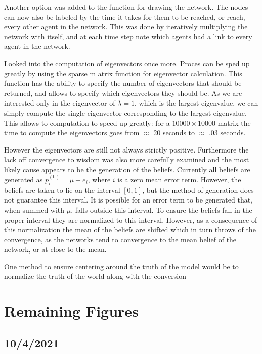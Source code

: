 \documentclass{article}
\begin{document}
Another option was added to the function for drawing the network. The nodes can now also be labeled by the time it takes for them to be reached, or reach, every other agent in the network. This was done by iteratively multiplying the network with itself, and at each time step note which agents had a link to every agent in the network. \newline

Looked into the computation of eigenvectors once more. Proces can be sped up greatly by using the sparse m atrix function for eigenvector calculation. This function has the ability to specify the number of eigenvectors that should be returned, and allows to specify which eigenvectors they should be. As we are interested only in the eigenvector of $\lambda=1$, which is the largest eigenvalue, we can simply compute the single eigenvector corresponding to the largest eigenvalue. This allows to computation to speed up greatly: for a $10000\times 10000$ matrix the time to compute the eigenvectors goes from $\approx$ 20 seconds to $\approx$ .03 seconds.

However the eigenvectors are still not always strictly positive. Furthermore the lack off convergence to wisdom was also more carefully examined and the most likely cause appears to be the generation of the beliefs. Currently all beliefs are generated as $p_i^{(0)} = \mu + e_i$, where $i$ is a zero mean error term. However, the beliefs are taken to lie on the interval $[0, 1]$, but the method of generation does not guarantee this interval. It is possible for an error term to be generated that, when summed with $\mu$, falls outside this interval. To ensure the beliefs fall in the proper interval they are normalized to this interval. However, as a consequence of this normalization the mean of the beliefs are shifted which in turn throws of the convergence, as the networks tend to convergence to the mean belief of the network, or at close to the mean. 

One method to ensure centering around the truth of the model would be to normalize the truth of the world along with the conversion 

\newpage

\section{Remaining Figures}

\subsection{10/4/2021}
\end{document}
